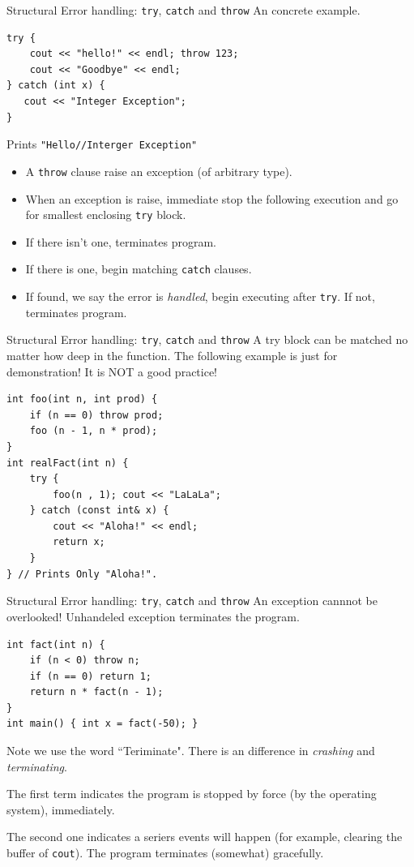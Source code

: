 \begin{frame}[fragile]{Structural Error handling: \texttt{try}, \texttt{catch} and \texttt{throw}}
An concrete example. 
\begin{verbatim}
try {
    cout << "hello!" << endl; throw 123;
    cout << "Goodbye" << endl;
} catch (int x) {
   cout << "Integer Exception";
}
\end{verbatim}
Prints \texttt{"Hello//Interger Exception"}
\begin{itemize}
	\item A \texttt{throw} clause raise an exception (of arbitrary type).
	\item When an exception is raise, immediate stop the following execution and go for smallest enclosing \texttt{try} block.
	\item If there isn't one, terminates program.
	\item If there is one, begin matching \texttt{catch} clauses.
	\item If found, we say the error is \textit{handled}, begin executing after \texttt{try}. If not, terminates program.
\end{itemize}
\end{frame}

\begin{frame}[fragile]{Structural Error handling: \texttt{try}, \texttt{catch} and \texttt{throw}}
A try block can be matched no matter how deep in the function. The following example is just for demonstration! \alert{It is NOT a good practice!}
\begin{verbatim}
int foo(int n, int prod) {
    if (n == 0) throw prod;
    foo (n - 1, n * prod);
}
int realFact(int n) {
    try {
        foo(n , 1); cout << "LaLaLa";
    } catch (const int& x) {
        cout << "Aloha!" << endl;
        return x;
    }
} // Prints Only "Aloha!".
\end{verbatim}

\end{frame}

\begin{frame}[fragile]{Structural Error handling: \texttt{try}, \texttt{catch} and \texttt{throw}}
An exception cannnot be overlooked! Unhandeled exception terminates the program.
\begin{verbatim}
int fact(int n) { 
    if (n < 0) throw n; 
	if (n == 0) return 1;
	return n * fact(n - 1);
}
int main() { int x = fact(-50); }
\end{verbatim}
Note we use the word ``Teriminate". There is an difference in \textit{crashing} and \textit{terminating}. 

The first term indicates the program is stopped by force (by the operating system), immediately. 

The second one indicates a seriers events will happen (for example, clearing the buffer of \texttt{cout}). The program terminates (somewhat) gracefully.
\end{frame}

